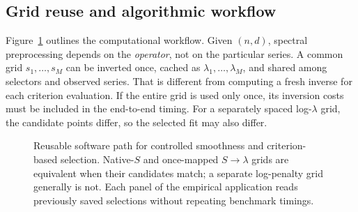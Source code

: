 \subsection{Grid reuse and algorithmic workflow}
Figure~\ref{fig:expanded-schematic} outlines the
computational workflow. Given $(n,d)$, spectral
preprocessing depends on the \emph{operator}, not
on the particular series. A common grid
$s_1,\ldots,s_M$ can be inverted once,
cached as $\lambda_1,\ldots,\lambda_M$,
and shared among selectors and observed series.
That is different from computing a fresh inverse
for each criterion evaluation. If the entire grid
is used only once, its inversion costs must be
included in the end-to-end timing. For a
separately spaced log-$\lambda$ grid, the
candidate points differ, so the selected fit may
also differ.

\begin{figure}[tbp]
\centering
\setlength{\fboxsep}{8pt}
\caption{Reusable software path for controlled smoothness
and criterion-based selection. Native-$S$ and once-mapped
$S\to\lambda$ grids are equivalent when their candidates
match; a separate log-penalty grid generally is not.
Each panel of the empirical application reads previously
saved selections without repeating benchmark timings.}
\label{fig:expanded-schematic}
\end{figure}

